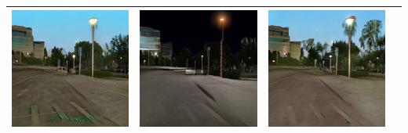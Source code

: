 \documentclass{VUMIFPSkursinis}
\begin{document}
\begin{table}[H]
{\begin{tabular}{|c|c|c|c|}
                \includegraphics[scale=0.35]{img/pvz/7_cycle} & \includegraphics[scale=0.35]{img/pvz/7_cut} & \includegraphics[scale=0.35]{img/pvz/7_mspc}
                \\
                \hline
                \end{tabular}
            }
            \label{tab:table example}
        \end{table}
\end{document}
